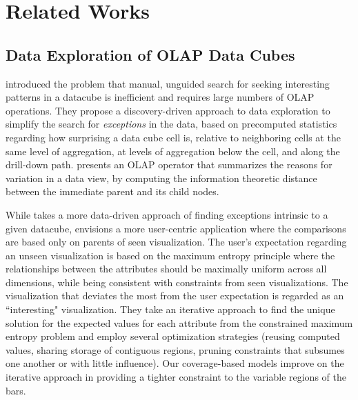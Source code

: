\section{Related Works}
\subsection{Data Exploration of OLAP Data Cubes}
\cite{Sarawagi1998} introduced the problem that manual, unguided search for seeking interesting patterns in a datacube is inefficient and requires large numbers of OLAP operations. They propose a discovery-driven approach to data exploration to simplify the search for \textit{exceptions} in the data, based on precomputed statistics regarding how surprising a data cube cell is, relative to neighboring cells at the same level of aggregation, at levels of aggregation below the cell, and along the drill-down path.  \cite{Sarawagi1999} presents an OLAP operator that summarizes the reasons for variation in a data view, by computing the information theoretic distance between the immediate parent and its child nodes.
\par While \cite{Sarawagi1998} takes a more data-driven approach of finding exceptions intrinsic to a given datacube,  \cite{Sarawagi2000} envisions a more user-centric application where the comparisons are based only on parents of seen visualization. The user's expectation regarding an unseen visualization is based on the maximum entropy principle where the relationships between the attributes should be maximally uniform across all dimensions, while being consistent with constraints from seen visualizations. The visualization that deviates the most from the user expectation is regarded as an ``interesting" visualization. They take an iterative approach to find the unique solution for the expected values for each attribute from the constrained maximum entropy problem and employ several optimization strategies (reusing computed values, sharing storage of contiguous regions, pruning constraints that subsumes one another or with little influence). Our coverage-based models improve on the iterative approach in providing a tighter constraint to the variable regions of the bars.
